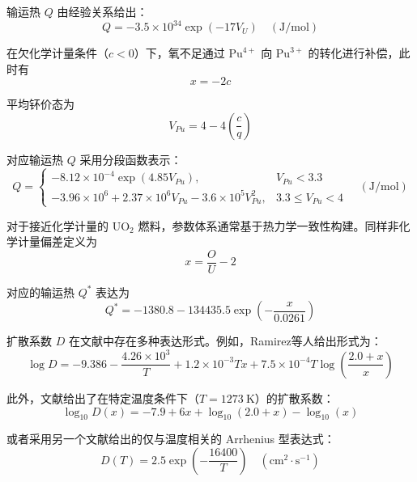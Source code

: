 输运热 $Q$ 由经验关系给出：
\begin{equation}
	Q = -3.5 \times 10^{34} \exp\left(-17 V_U\right) \quad (\mathrm{J/mol})
\end{equation}

在欠化学计量条件（$c<0$）下，氧不足通过 $\mathrm{Pu}^{4+}$ 向 $\mathrm{Pu}^{3+}$ 的转化进行补偿，此时有
\begin{equation}
	x = -2c
\end{equation}

平均钚价态为
\begin{equation}
	V_{Pu} = 4 - 4\left( \frac{c}{q} \right)
\end{equation}

对应输运热 $Q$ 采用分段函数表示：
\begin{equation}
	Q =
	\begin{cases}
		-8.12 \times 10^{-4} \exp\left(4.85 V_{Pu}\right), & V_{Pu} < 3.3 \\[6pt]
		-3.96 \times 10^{6} + 2.37 \times 10^{6} V_{Pu} - 3.6 \times 10^{5} V_{Pu}^2, & 3.3 \le V_{Pu} < 4
	\end{cases}
	\quad (\mathrm{J/mol})
\end{equation}

对于接近化学计量的 UO$_2$ 燃料，参数体系通常基于热力学一致性构建。同样非化学计量偏差定义为
\begin{equation}
	x = \frac{O}{U} - 2
\end{equation}

对应的输运热 $Q^*$ 表达为
\begin{equation}
	Q^* = -1380.8 - 134435.5 \exp\left(-\frac{x}{0.0261}\right)
\end{equation}

扩散系数 $D$ 在文献中存在多种表达形式。例如，Ramirez等人\cite{ramirezSimulationsHeatOxygen2006}给出形式为：
\begin{equation}
	\log D = -9.386 - \frac{4.26 \times 10^{3}}{T} + 1.2 \times 10^{-3} T x
	+ 7.5 \times 10^{-4} T \log\left(\frac{2.0 + x}{x}\right)
\end{equation}

此外，文献\cite{ruelloChemicalDiffusionUranium2004}给出了在特定温度条件下（$T=1273\ \mathrm{K}$）的扩散系数：
\begin{equation}
	\log_{10} D(x) = -7.9 + 6x + \log_{10}(2.0 + x) - \log_{10}(x)
\end{equation}

或者采用另一个文献\cite{higgsConceptualModelFuel2007}给出的仅与温度相关的 Arrhenius 型表达式：
\begin{equation}
	D(T) = 2.5 \exp\left(-\frac{16400}{T}\right) \quad (\mathrm{cm}^2\cdot\mathrm{s}^{-1})
\end{equation}

